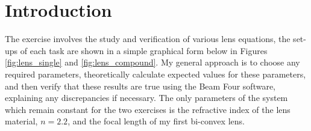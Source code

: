 \documentclass[colorlinks,11pt,a4paper,normalphoto,withhyper,ragged2e]{altareport}
\begin{document}
	\MakeReportTitlePage
	
	
	\setcounter{page}{1}
	
	
%	
%	
%	
%	
%	
%	
%	
%	
%	
%	




	\section{Introduction}
		The exercise involves the study and verification of various lens equations, the set-ups of each task are shown in a simple graphical form below in Figures \ref{fig:lens_single} and \ref{fig:lens_compound}. My general approach is to choose any required parameters, theoretically calculate expected values for these parameters, and then verify that these results are true using the Beam Four software, explaining any discrepancies if necessary. \linebreak
		The only parameters of the system which remain constant for the two exercises is the refractive index of the lens material, $n=2.2$, and the focal length of my first bi-convex lens. \linebreak
		
\end{document}
